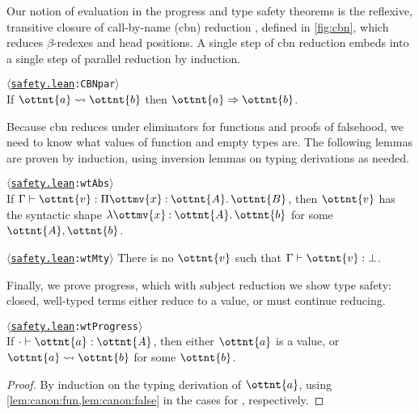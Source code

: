 \documentclass[a4paper,UKenglish,cleveref,autoref,thm-restate]{lipics-v2021}
\newcommand{\repo}{https://github.com/ionathanch/TTBFL}
\newcommand{\thmref}[2]{%
  $\langle$\href{\repo/tree/main/src/#1}{\texttt{#1}}\texttt{:#2}$\rangle$%
}
\begin{document}
Our notion of evaluation in the progress and type safety theorems
is the reflexive, transitive closure 
of call-by-name (cbn) reduction ,
defined in \cref{fig:cbn},
which reduces $\beta$-redexes and head positions.
A single step of cbn reduction embeds into
a single step of parallel reduction by induction.

\begin{lemma} \thmref{safety.lean}{CBNpar} \\
  If $ \ottnt{a}  \rightsquigarrow  \ottnt{b} $ then $ \ottnt{a}  \Rightarrow  \ottnt{b} $.
\end{lemma}

Because cbn reduces under eliminators for functions and proofs of falsehood,
we need to know what values of function and empty types are.
The following lemmas are proven by induction,
using inversion lemmas on typing derivations as needed.

\begin{lemma} \thmref{safety.lean}{wtAbs} \label{lem:canon:fun} \\
  If $ \Gamma  \vdash  \ottnt{v}  \mathrel{:}   \Pi  \ottmv{x}  \mathbin{:}  \ottnt{A}  \mathpunct{.}  \ottnt{B}  $,
  then $\ottnt{v}$ has the syntactic shape $ \lambda  \ottmv{x}  \mathbin{:}  \ottnt{A}  \mathpunct{.}  \ottnt{b} $ for some $\ottnt{A}, \ottnt{b}$.
\end{lemma}

\begin{lemma} \thmref{safety.lean}{wtMty} \label{lem:canon:false}
  There is no $\ottnt{v}$ such that $ \Gamma  \vdash  \ottnt{v}  \mathrel{:}   \bot  $.
\end{lemma}

Finally, we prove progress, which with subject reduction we show type safety:
closed, well-typed terms either reduce to a value, or must continue reducing.

\begin{theorem}[Progress] \thmref{safety.lean}{wtProgress} \label{lem:progress} \\
  If $  \cdot   \vdash  \ottnt{a}  \mathrel{:}  \ottnt{A} $, then either $\ottnt{a}$ is a value,
  or $ \ottnt{a}  \rightsquigarrow  \ottnt{b} $ for some $\ottnt{b}$.
\end{theorem}

\begin{proof}
  By induction on the typing derivation of $\ottnt{a}$,
  using \cref{lem:canon:fun,lem:canon:false}
  in the cases for , respectively.
\end{proof}
\end{document}
